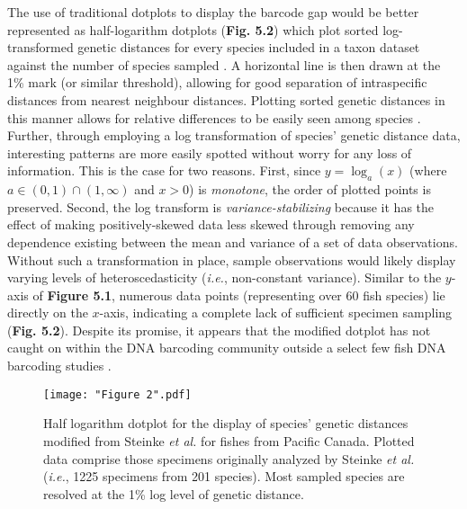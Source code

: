The use of traditional dotplots to display the barcode gap would be better represented as half-logarithm dotplots (\textbf{Fig. 5.2}) which plot sorted log-transformed genetic distances for every species included in a taxon dataset against the number of species sampled \cite{steinke2009dna, steinke2009barcoding}. A horizontal line is then drawn at the 1\% mark (or similar threshold), allowing for good separation of intraspecific distances from nearest neighbour distances. Plotting sorted genetic distances in this manner allows for relative differences to be easily seen among species \cite{steinke2009dna}. Further, through employing a log transformation of species' genetic distance data, interesting patterns are more easily spotted without worry for any loss of information. This is the case for two reasons. First, since $y = \log_{a}(x)$ (where $a \in (0, 1) \cap (1, \infty)$ and $x>0$) is \textit{monotone}, the order of plotted points is preserved. Second, the log transform is \textit{variance-stabilizing} because it has the effect of making positively-skewed data less skewed through removing any dependence existing between the mean and variance of a set of data observations. Without such a transformation in place, sample observations would likely display varying levels of heteroscedasticity (\textit{i.e.}, non-constant variance). Similar to the $y$-axis of \textbf{Figure 5.1}, numerous data points (representing over 60 fish species) lie directly on the $x$-axis, indicating a complete lack of sufficient specimen sampling (\textbf{Fig. 5.2}). Despite its promise, it appears that the modified dotplot has not caught on within the DNA barcoding community outside a select few fish DNA barcoding studies \cite{steinke2009dna, steinke2009barcoding}. 

\begin{figure}[H]

\centering

\texttt{[image: "Figure 2".pdf]}

\caption[Depiction of intraspecific and interspecific genetic distances as a modified dotplot for Canadian Pacific fishes assessed by Steinke \textit{et al.} \cite{steinke2009dna}.]{Half logarithm dotplot for the display of species' genetic distances modified from Steinke \textit{et al.} \cite{steinke2009dna} for fishes from Pacific Canada. Plotted data comprise those specimens originally analyzed by Steinke \textit{et al.} \cite{steinke2009dna} (\textit{i.e.}, 1225 specimens from 201 species). Most sampled species are resolved at the 1\% log level of genetic distance.}

\end{figure}



